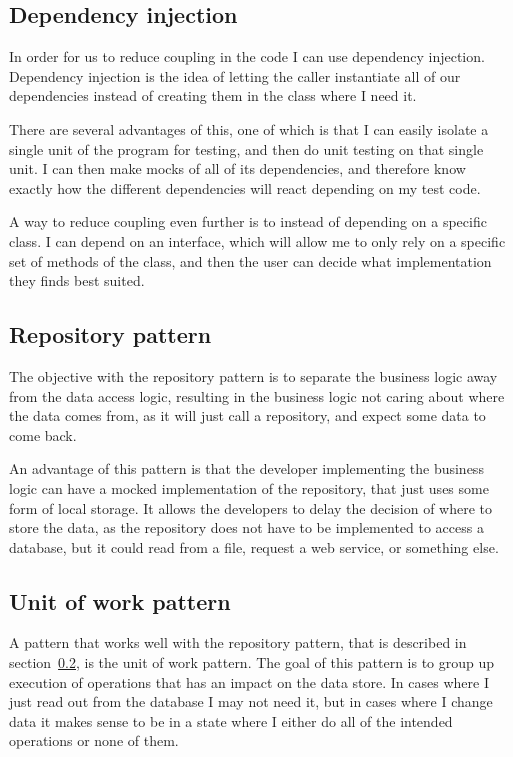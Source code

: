 \subsection{Dependency injection}
\label{sub:Dependency injection}
In order for us to reduce coupling in the code I can use dependency injection. Dependency injection is the idea of letting the caller instantiate all of our dependencies instead of creating them in the class where I need it.

There are several advantages of this, one of which is that I can easily isolate a single unit of the program for testing, and then do unit testing on that single unit. I can then make mocks of all of its dependencies, and therefore know exactly how the different dependencies will react depending on my test code\cite{dependency_injection}.

A way to reduce coupling even further is to instead of depending on a specific class. I can depend on an interface, which will allow me to only rely on a specific set of methods of the class, and then the user can decide what implementation they finds best suited.

\subsection{Repository pattern}
\label{sub:Repository pattern}
The objective with the repository pattern is to separate the business logic away from the data access logic, resulting in the business logic not caring about where the data comes from, as it will just call a repository, and expect some data to come back.

An advantage of this pattern is that the developer implementing the business logic can have a mocked implementation of the repository, that just uses some form of local storage. It allows the developers to delay the decision of where to store the data, as the repository does not have to be implemented to access a database, but it could read from a file, request a web service, or something else\cite{repository_pattern}.

\subsection{Unit of work pattern}
\label{sub:Unit of work pattern}
A pattern that works well with the repository pattern, that is described in section~\ref{sub:Repository pattern}, is the unit of work pattern. The goal of this pattern is to group up execution of operations that has an impact on the data store. In cases where I just read out from the database I may not need it, but in cases where I change data it makes sense to be in a state where I either do all of the intended operations or none of them.

